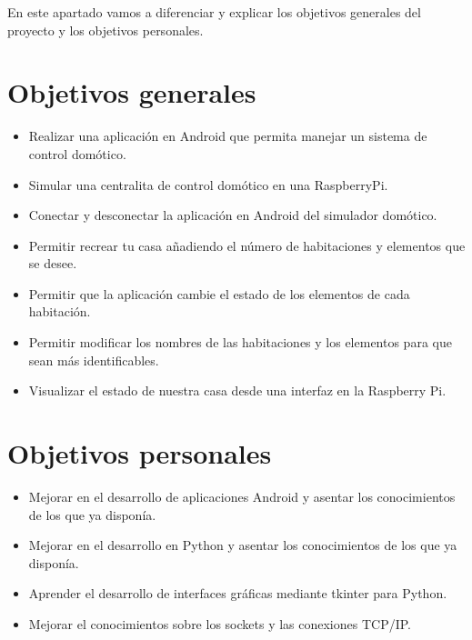 
En este apartado vamos a diferenciar y explicar los objetivos generales del proyecto y los objetivos personales.

\section{Objetivos generales}
\begin{itemize}
	\item Realizar una aplicación en Android que permita manejar un sistema de control domótico.
	\item Simular una centralita de control domótico en una RaspberryPi.
	\item Conectar y desconectar la aplicación en Android del simulador domótico.
	\item Permitir recrear tu casa añadiendo el número de habitaciones y elementos que se desee.
	\item Permitir que la aplicación cambie el estado de los elementos de cada habitación.
	\item Permitir modificar los nombres de las habitaciones y los elementos para que sean más identificables.
	\item Visualizar el estado de nuestra casa desde una interfaz en la Raspberry Pi.
\end{itemize}
\section{Objetivos personales}

\begin{itemize}
	\item Mejorar en el desarrollo de aplicaciones Android y asentar los conocimientos de los que ya disponía.
	\item Mejorar en el desarrollo en Python y asentar los conocimientos de los que ya disponía.
	\item Aprender el desarrollo de interfaces gráficas mediante tkinter para Python.
	\item Mejorar el conocimientos sobre los sockets y las conexiones TCP/IP.
\end{itemize}